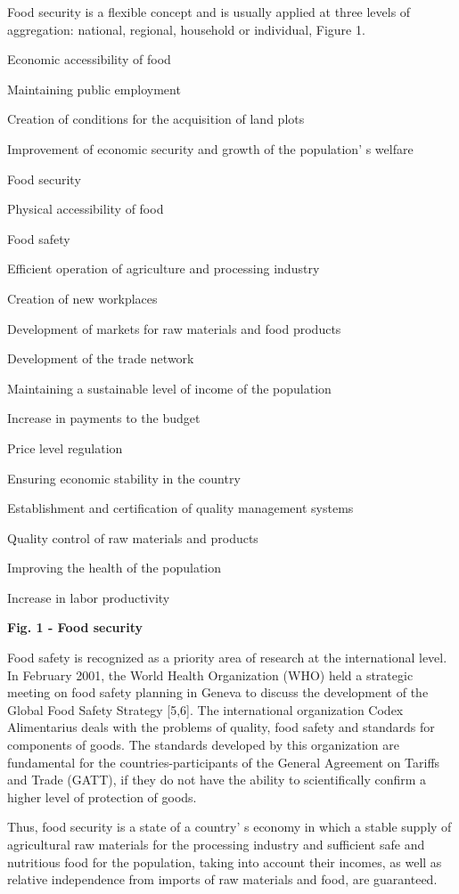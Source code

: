 {Food security is a flexible concept and is usually applied at three
levels of aggregation: national, regional, household or individual,
Figure 1.

Economic accessibility of food

Maintaining public employment

Creation of conditions for the acquisition of land plots

Improvement of economic security and growth of the
population' s welfare

Food security

Physical accessibility of food

Food safety

Efficient operation of agriculture and processing industry

Creation of new workplaces

Development of markets for raw materials and food products

Development of the trade network

Maintaining a sustainable level of income of the population

Increase in payments to the budget

Price level regulation

Ensuring economic stability in the country

Establishment and certification of quality management systems

Quality control of raw materials and products

Improving the health of the population

Increase in labor productivity

{\bfseries Fig. 1 - Food security}

Food safety is recognized as a priority area of research at the
international level. In February 2001, the World Health Organization
(WHO) held a strategic meeting on food safety planning in Geneva to
discuss the development of the Global Food Safety Strategy {[}5,6{]}.
The international organization Codex Alimentarius deals with the
problems of quality, food safety and standards for components of goods.
The standards developed by this organization are fundamental for the
countries-participants of the General Agreement on Tariffs and Trade
(GATT), if they do not have the ability to scientifically confirm a
higher level of protection of goods.

Thus, food security is a state of a country' s economy in
which a stable supply of agricultural raw materials for the processing
industry and sufficient safe and nutritious food for the population,
taking into account their incomes, as well as relative independence from
imports of raw materials and food, are guaranteed.

}
